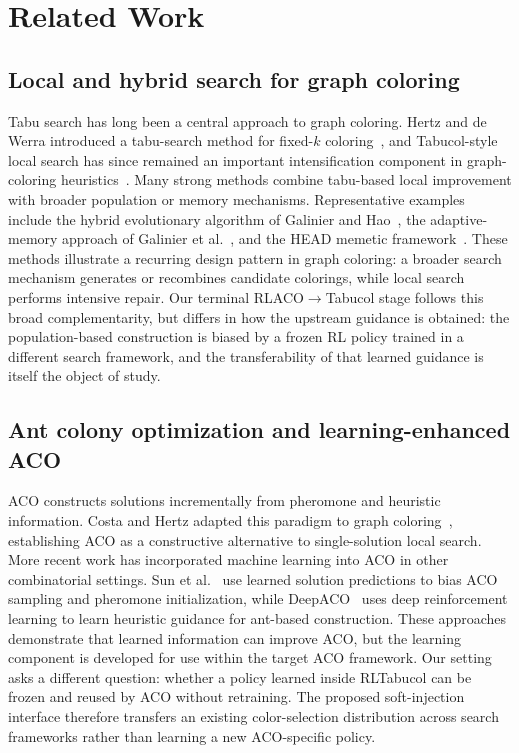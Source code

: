 \section{Related Work}
\label{sec:related}

\subsection{Local and hybrid search for graph coloring}

Tabu search has long been a central approach to graph coloring. Hertz and de Werra introduced a tabu-search method for fixed-$k$ coloring~\cite{hertz1987tabu}, and Tabucol-style local search has since remained an important intensification component in graph-coloring heuristics~\cite{malaguti2010survey}. Many strong methods combine tabu-based local improvement with broader population or memory mechanisms. Representative examples include the hybrid evolutionary algorithm of Galinier and Hao~\cite{galinier1999hybrid}, the adaptive-memory approach of Galinier et al.~\cite{GalinierHertzZufferey2008}, and the HEAD memetic framework~\cite{moalic2018head}. These methods illustrate a recurring design pattern in graph coloring: a broader search mechanism generates or recombines candidate colorings, while local search performs intensive repair. Our terminal RLACO$\rightarrow$Tabucol stage follows this broad complementarity, but differs in how the upstream guidance is obtained: the population-based construction is biased by a frozen RL policy trained in a different search framework, and the transferability of that learned guidance is itself the object of study.

\subsection{Ant colony optimization and learning-enhanced ACO}

ACO constructs solutions incrementally from pheromone and heuristic information. Costa and Hertz adapted this paradigm to graph coloring~\cite{costa1997ants}, establishing ACO as a constructive alternative to single-solution local search. More recent work has incorporated machine learning into ACO in other combinatorial settings. Sun et al.~\cite{sun2022boosting} use learned solution predictions to bias ACO sampling and pheromone initialization, while DeepACO~\cite{ye2023deepaco} uses deep reinforcement learning to learn heuristic guidance for ant-based construction. These approaches demonstrate that learned information can improve ACO, but the learning component is developed for use within the target ACO framework. Our setting asks a different question: whether a policy learned inside RLTabucol can be frozen and reused by ACO without retraining. The proposed soft-injection interface therefore transfers an existing color-selection distribution across search frameworks rather than learning a new ACO-specific policy.

